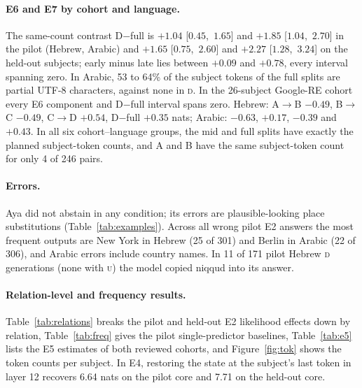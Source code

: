 \documentclass[11pt]{article}
\newcommand{\U}{\textsc{u}}
\newcommand{\D}{\textsc{d}}
\newcommand{\cA}{\textsf{A}}
\newcommand{\cB}{\textsf{B}}
\newcommand{\cC}{\textsf{C}}
\newcommand{\cD}{\textsf{D}}
\newcommand{\ci}[2]{\mbox{[$#1$, $#2$]}}
\begin{document}
\paragraph{E6 and E7 by cohort and language.} The same-count contrast \cD$-$\textsf{full} is
$+1.04$ \ci{0.45}{1.65} and $+1.85$ \ci{1.04}{2.70} in the pilot (Hebrew, Arabic)
and $+1.65$ \ci{0.75}{2.60} and $+2.27$ \ci{1.28}{3.24} on the held-out subjects;
early minus late lies between $+0.09$ and $+0.78$, every interval spanning zero.
In Arabic, 53 to 64\% of the subject tokens of the \textsf{full} splits are
partial UTF-8 characters, against none in \D.
In the 26-subject Google-RE cohort every E6 component and \cD$-$\textsf{full}
interval spans zero. Hebrew: \cA$\to$\cB{} $-0.49$, \cB$\to$\cC{} $-0.49$,
\cC$\to$\cD{} $+0.54$, \cD$-$\textsf{full} $+0.35$ nats; Arabic: $-0.63$, $+0.17$,
$-0.39$ and $+0.43$. In all six cohort--language groups, the \textsf{mid} and \textsf{full}
splits have exactly the planned subject-token counts, and \cA{} and \cB{} have the
same subject-token count for only 4 of 246 pairs.

\paragraph{Errors.} Aya did not abstain in any condition; its errors are
plausible-looking place substitutions (Table~\ref{tab:examples}). Across all wrong
pilot E2 answers the most frequent outputs are New York in Hebrew (25 of 301) and
Berlin in Arabic (22 of 306), and Arabic errors include country names. In 11 of
171 pilot Hebrew \D{} generations (none with \U) the model copied niqqud into its
answer.

\paragraph{Relation-level and frequency results.}
Table~\ref{tab:relations} breaks the pilot and held-out E2 likelihood effects
down by relation, Table~\ref{tab:freq} gives the pilot single-predictor baselines,
Table~\ref{tab:e5} lists the E5 estimates of both reviewed cohorts, and
Figure~\ref{fig:tok} shows the token counts per subject. In E4, restoring the
state at the subject's last token in layer 12 recovers 6.64 nats on the pilot core and 7.71 on
the held-out core.
\end{document}
